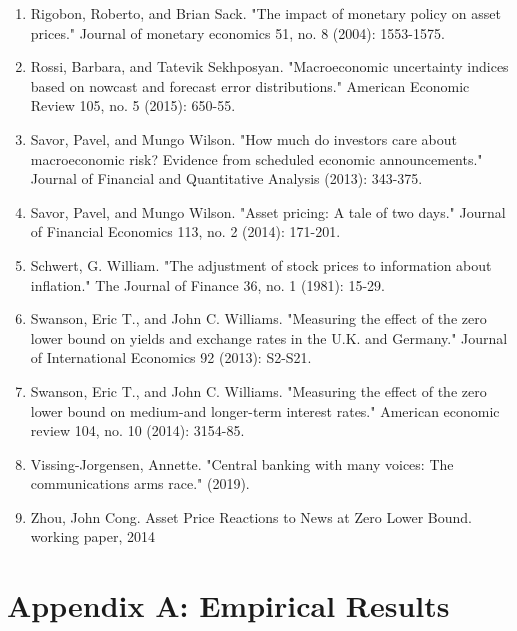 \documentclass[12pt]{article}
\begin{document}
\begin{enumerate}
    \item{Rigobon, Roberto, and Brian Sack. "The impact of monetary policy on asset prices." Journal of monetary economics 51, no. 8 (2004): 1553-1575.}
    \item{Rossi, Barbara, and Tatevik Sekhposyan. "Macroeconomic uncertainty indices based on nowcast and forecast error distributions." American Economic Review 105, no. 5 (2015): 650-55.}
    \item{Savor, Pavel, and Mungo Wilson. "How much do investors care about macroeconomic risk? Evidence from scheduled economic announcements." Journal of Financial and Quantitative Analysis (2013): 343-375.}
    \item{Savor, Pavel, and Mungo Wilson. "Asset pricing: A tale of two days." Journal of Financial Economics 113, no. 2 (2014): 171-201.}
    \item{Schwert, G. William. "The adjustment of stock prices to information about inflation." The Journal of Finance 36, no. 1 (1981): 15-29.}
    \item{Swanson, Eric T., and John C. Williams. "Measuring the effect of the zero lower bound on yields and exchange rates in the U.K. and Germany." Journal of International Economics 92 (2013):  S2-S21.}
    \item{Swanson, Eric T., and John C. Williams. "Measuring the effect of the zero lower bound on medium-and longer-term interest rates." American economic review 104, no. 10 (2014): 3154-85.}
    \item{Vissing-Jorgensen, Annette. "Central banking with many voices: The communications arms race." (2019).}
    \item{Zhou, John Cong. Asset Price Reactions to News at Zero Lower Bound. working paper, 2014}
\end{enumerate}
    
\pagebreak

\section{Appendix A: Empirical Results} \label{sec:Model}
\end{document}

